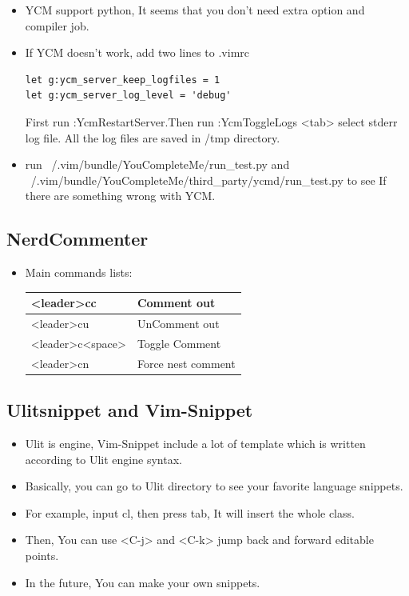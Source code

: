 \documentclass[a4paper,12pt,twoside]{book}
\begin{document}
\begin{itemize}
\item YCM support python, It seems that you don't need extra option and compiler job.		

\item If YCM doesn't work, add two lines to .vimrc 
\begin{verbatim}
let g:ycm_server_keep_logfiles = 1
let g:ycm_server_log_level = 'debug'
\end{verbatim}

First run :YcmRestartServer.Then run :YcmToggleLogs <tab> select stderr log file. All the log files are saved in /tmp directory. 
\item run ~/.vim/bundle/YouCompleteMe/run\_test.py and ~/.vim/bundle/YouCompleteMe/third_party/ycmd/run\_test.py to see If there are something wrong with YCM. 	
\end{itemize}

\subsection{NerdCommenter}
\begin{itemize}
		\item Main commands lists:  

\begin{tabular}{p{}|p{}}
		\hline 
		[count]<leader>cc & Comment out \\
		\hline 
		[count]<leader>cu & UnComment out \\
		\hline 
		[count]<leader>c<space> & Toggle Comment \\
		\hline
		[count]<leader>cn & Force nest comment \\
\end{tabular}
\end{itemize}

\subsection{Ulitsnippet and Vim-Snippet}
\begin{itemize}
\item Ulit is engine, Vim-Snippet include a lot of template which is written according to Ulit engine syntax. 
\item Basically, you can go to Ulit directory to see your favorite language snippets. 
\item For example, input cl, then press tab, It will insert the whole class. 
\item Then, You can use <C-j> and <C-k> jump back and forward editable points. 
\item In the future, You can make your own snippets. 
\end{itemize}
\end{document}
